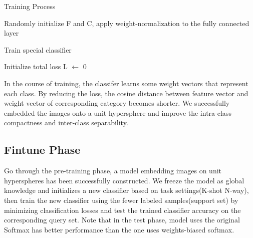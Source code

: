 \documentclass[runningheads]{llncs}
\begin{document}
\begin{algorithm}[H]
\label{alg1}
\caption{Training Process}%
\LinesNumbered %
Randomly initialize F and C, apply weight-normalization to the fully connected layer\;
\end{algorithm}
\begin{algorithm}[H]
\label{alg2}
\caption{Train special classifier}%
\LinesNumbered %
Initialize total loss L $\longleftarrow$ 0\; %
\end{algorithm}
In the course of training, the classifer learns some weight vectors that represent each class. By reducing the loss, the cosine distance between feature vector and weight vector of corresponding category becomes shorter. We successfully embedded the images onto a unit hypersphere and improve the intra-class compactness and inter-class separability.
\subsection{Fintune Phase}
Go through the pre-training phase, a model embedding images on unit hyperspheres has been successfully constructed. We freeze the model as global knowledge and initializes a new classifier based on task settings(K-shot N-way), then train the new classifier using the fewer labeled samples(support set) by minimizing classification losses and test the trained classifier accuracy on the corresponding query set. Note that in the test phase, model uses the original Softmax has better performance than the one uses weights-biased softmax.
\end{document}
